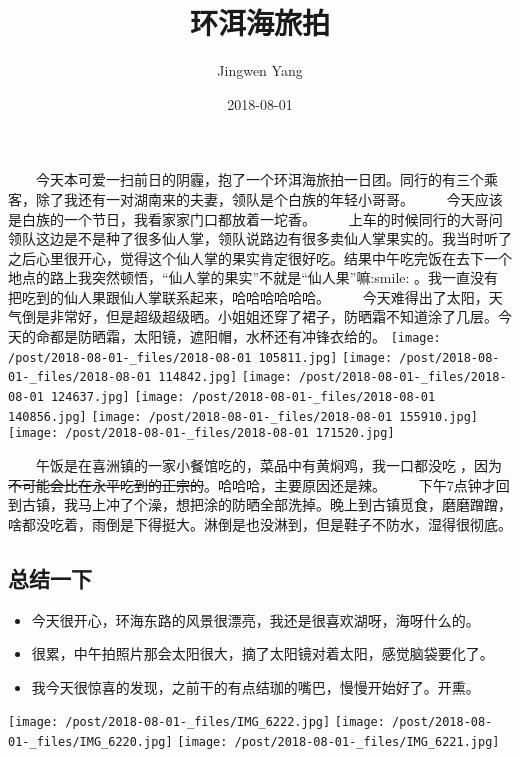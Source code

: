 \documentclass[hyperref,]{ctexart}
\title{环洱海旅拍}
\author{Jingwen Yang}
\date{2018-08-01}
\providecommand{\tightlist}{%
  \setlength{\itemsep}{0pt}\setlength{\parskip}{0pt}}
\begin{document}
\maketitle

{
\setcounter{tocdepth}{2}
\tableofcontents
}
  今天本可爱一扫前日的阴霾，抱了一个环洱海旅拍一日团。同行的有三个乘客，除了我还有一对湖南来的夫妻，领队是个白族的年轻小哥哥。
  今天应该是白族的一个节日，我看家家门口都放着一坨香。
  上车的时候同行的大哥问领队这边是不是种了很多仙人掌，领队说路边有很多卖仙人掌果实的。我当时听了之后心里很开心，觉得这个仙人掌的果实肯定很好吃。结果中午吃完饭在去下一个地点的路上我突然顿悟，``仙人掌的果实''不就是``仙人果''嘛:smile:
。我一直没有把吃到的仙人果跟仙人掌联系起来，哈哈哈哈哈哈。
  今天难得出了太阳，天气倒是非常好，但是超级超级晒。小姐姐还穿了裙子，防晒霜不知道涂了几层。今天的命都是防晒霜，太阳镜，遮阳帽，水杯还有冲锋衣给的。
\texttt{[image: /post/2018-08-01-\_files/2018-08-01 105811.jpg]}
\texttt{[image: /post/2018-08-01-\_files/2018-08-01 114842.jpg]}
\texttt{[image: /post/2018-08-01-\_files/2018-08-01 124637.jpg]}
\texttt{[image: /post/2018-08-01-\_files/2018-08-01 140856.jpg]}
\texttt{[image: /post/2018-08-01-\_files/2018-08-01 155910.jpg]}
\texttt{[image: /post/2018-08-01-\_files/2018-08-01 171520.jpg]}

  午饭是在喜洲镇的一家小餐馆吃的，菜品中有黄焖鸡，我一口都没吃🌚，因为\sout{不可能会比在永平吃到的正宗的}。哈哈哈，主要原因还是辣。
  下午7点钟才回到古镇，我马上冲了个澡，想把涂的防晒全部洗掉。晚上到古镇觅食，磨磨蹭蹭，啥都没吃着，雨倒是下得挺大。淋倒是也没淋到，但是鞋子不防水，湿得很彻底。

\subsection{总结一下}

\begin{itemize}
\tightlist
\item
  今天很开心，环海东路的风景很漂亮，我还是很喜欢湖呀，海呀什么的。
\item
  很累，中午拍照片那会太阳很大，摘了太阳镜对着太阳，感觉脑袋要化了。
\item
  我今天很惊喜的发现，之前干的有点结珈的嘴巴，慢慢开始好了。开熏。
\end{itemize}

\texttt{[image: /post/2018-08-01-\_files/IMG\_6222.jpg]}
\texttt{[image: /post/2018-08-01-\_files/IMG\_6220.jpg]}
\texttt{[image: /post/2018-08-01-\_files/IMG\_6221.jpg]}
\end{document}
